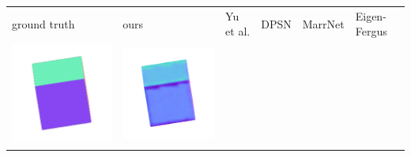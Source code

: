 \begin{center}
\begin{tabularx}{\linewidth}{@{}Y@{}Y@{}Y@{}Y@{}Y@{}Y@{}}
ground truth & ours & Yu et al. & DPSN & MarrNet & Eigen-Fergus \\
\includegraphics[width=\linewidth]{semisynthetic/20160617_0_gt.png} &
\includegraphics[width=\linewidth]{semisynthetic/20160617_0_ours_out.png} &

\end{tabularx}
\end{center}
